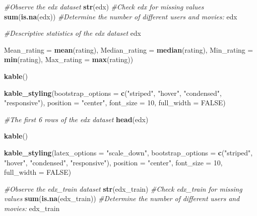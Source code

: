 \documentclass[
]{article}
\newenvironment{Shaded}{}{}
\newcommand{\CommentTok}[1]{\textcolor[rgb]{0.38,0.63,0.69}{\textit{#1}}}
\newcommand{\DataTypeTok}[1]{\textcolor[rgb]{0.56,0.13,0.00}{#1}}
\newcommand{\DecValTok}[1]{\textcolor[rgb]{0.25,0.63,0.44}{#1}}
\newcommand{\KeywordTok}[1]{\textcolor[rgb]{0.00,0.44,0.13}{\textbf{#1}}}
\newcommand{\NormalTok}[1]{#1}
\newcommand{\OperatorTok}[1]{\textcolor[rgb]{0.40,0.40,0.40}{#1}}
\newcommand{\OtherTok}[1]{\textcolor[rgb]{0.00,0.44,0.13}{#1}}
\newcommand{\StringTok}[1]{\textcolor[rgb]{0.25,0.44,0.63}{#1}}
\begin{document}
\begin{Shaded}
\begin{Highlighting}[]
{{\CommentTok{#Observe the edx dataset}
\KeywordTok{str}\NormalTok{(edx)}
\CommentTok{#Check edx for missing values}
\KeywordTok{sum}\NormalTok{(}\KeywordTok{is.na}\NormalTok{(edx))}
\CommentTok{#Determine the number of different users and movies:}
\NormalTok{edx }\OperatorTok{%

\CommentTok{#Descriptive statistics of the edx dataset}
\NormalTok{edx }\OperatorTok{%
                  \DataTypeTok{Mean_rating =} \KeywordTok{mean}\NormalTok{(rating), }\DataTypeTok{Median_rating =} \KeywordTok{median}\NormalTok{(rating),}
                  \DataTypeTok{Min_rating =} \KeywordTok{min}\NormalTok{(rating), }\DataTypeTok{Max_rating =} \KeywordTok{max}\NormalTok{(rating)) }\OperatorTok{%
\StringTok{  }\KeywordTok{kable}\NormalTok{() }\OperatorTok{%
\StringTok{  }\KeywordTok{kable_styling}\NormalTok{(}\DataTypeTok{bootstrap_options =} \KeywordTok{c}\NormalTok{(}\StringTok{"striped"}\NormalTok{, }\StringTok{"hover"}\NormalTok{, }\StringTok{"condensed"}\NormalTok{, }\StringTok{"responsive"}\NormalTok{),}
                \DataTypeTok{position =} \StringTok{"center"}\NormalTok{,}
                \DataTypeTok{font_size =} \DecValTok{10}\NormalTok{,}
                \DataTypeTok{full_width =} \OtherTok{FALSE}\NormalTok{)}

\CommentTok{#The first 6 rows of the edx dataset}
\KeywordTok{head}\NormalTok{(edx) }\OperatorTok{%
\StringTok{  }\KeywordTok{kable}\NormalTok{() }\OperatorTok{%
\StringTok{  }\KeywordTok{kable_styling}\NormalTok{(}\DataTypeTok{latex_options =} \StringTok{"scale_down"}\NormalTok{,}
                \DataTypeTok{bootstrap_options =} \KeywordTok{c}\NormalTok{(}\StringTok{"striped"}\NormalTok{, }\StringTok{"hover"}\NormalTok{, }\StringTok{"condensed"}\NormalTok{, }\StringTok{"responsive"}\NormalTok{),}
                \DataTypeTok{position =} \StringTok{"center"}\NormalTok{,}
                \DataTypeTok{font_size =} \DecValTok{10}\NormalTok{,}
                \DataTypeTok{full_width =} \OtherTok{FALSE}\NormalTok{)}

\CommentTok{#Observe the edx_train dataset}
\KeywordTok{str}\NormalTok{(edx_train)}
\CommentTok{#Check edx_train for missing values}
\KeywordTok{sum}\NormalTok{(}\KeywordTok{is.na}\NormalTok{(edx_train))}
\CommentTok{#Determine the number of different users and movies:}
\NormalTok{edx_train }\OperatorTok{%

}}}}}}}}}
\end{Highlighting}
\end{Shaded}
\end{document}
